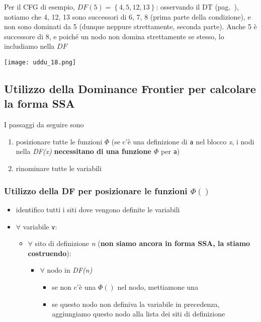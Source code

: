 \begin{example}
    \noindent\begin{minipage}[c]{.5\textwidth}
      Per il CFG di esempio, \underline{$DF(5) = \left\lbrace 4,5,12,13 \right\rbrace$}: osservando il DT (pag.~\pageref{example-dt}), notiamo che 4, 12, 13 sono successori di 6, 7, 8 (prima parte della condizione), e non sono dominati da 5 (dunque neppure strettamente, seconda parte). Anche 5 \`e successore di 8, e poich\'e un nodo non domina strettamente se stesso, lo includiamo nella $DF$
    \end{minipage}
    \begin{minipage}[c]{.5\textwidth}
    \texttt{[image: uddu\_18.png]}
    \end{minipage}
\end{example}

\subsection{Utilizzo della Dominance Frontier per calcolare la forma SSA}

I passaggi da seguire sono
\begin{enumerate}
  \item posizionare tutte le funzioni $\Phi$ (se c'\`e una definizione di \lstinline|a| nel blocco \textit{x}, i nodi nella \textit{DF(x)} \textbf{necessitano di una funzione $\Phi$} per \lstinline|a|)
  \item rinominare tutte le variabili
\end{enumerate}

\subsubsection{Utilizzo della DF per posizionare le funzioni $\Phi()$}

\begin{itemize}
  \item identifico tutti i siti dove vengono definite le variabili 
  \item $\forall$ variabile \lstinline|v|:
  \begin{itemize}
    \item $\forall$ sito di definizione \textit{n} (\textbf{non siamo ancora in forma SSA, la stiamo costruendo}):
    \begin{itemize}
      \item $\forall$ nodo in \textit{DF(n)}
      \begin{itemize}
        \item se non c'\`e una $\Phi()$ nel nodo, mettiamone una
        \item se questo nodo non definiva la variabile in precedenza, aggiungiamo questo nodo alla lista dei siti di definizione
      \end{itemize}
    \end{itemize}
  \end{itemize}
\end{itemize}


